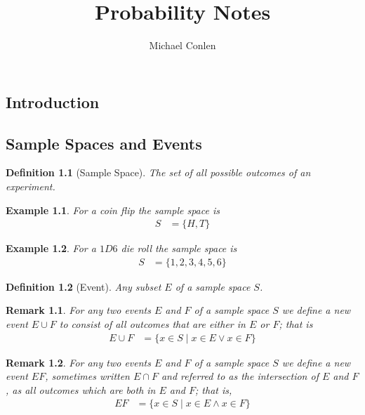 \documentclass[11pt, oneside]{book}   	%
\title{Probability Notes}
\author{Michael Conlen}
\newtheorem{definition}{Definition}[chapter]
\newtheorem{example}{Example}[chapter]
\newtheorem{remark}{Remark}[chapter]
\begin{document}
\frontmatter
\maketitle
\tableofcontents
\setcounter{tocdepth}{4}

\mainmatter
\begin{spacing}{1.618}
\chapter{Introduction}
\section{Sample Spaces and Events}
\begin{definition}[Sample Space]
	The set of all possible outcomes of an experiment. 
\end{definition}

\begin{example}
	For a coin flip the \emph{sample space} is 
	\begin{alignat}{4}
		S&=\{H, T\}
	\end{alignat}
\end{example}
\begin{example}
	For a $1D6$ die roll the \emph{sample space} is
	\begin{alignat}{4}
		S&=\{1, 2, 3, 4, 5, 6\}
	\end{alignat}
\end{example}

\begin{definition}[Event]
	Any subset $E$ of a sample space $S$.
\end{definition}

\begin{remark}
	For any two events $E$ and $F$ of a sample space $S$ we define a new event $E\cup F$ to consist of all outcomes that are either in $E$ or $F$; that is
	\begin{alignat}{4}
		E\cup F&=\{x\in S\mid x\in E \vee x\in F\}
	\end{alignat}
\end{remark}

\begin{remark}
	For any two events $E$ and $F$ of a sample space $S$ we define a new event $EF$, sometimes written $E\cap F$ and referred to as the intersection of $E$ and $F$, as all outcomes which are both in $E$ and $F$; that is, 
	\begin{alignat}{4}
		EF&=\{x\in S\mid x\in E \wedge x\in F\}
	\end{alignat}
\end{remark}


\end{spacing}
\end{document}
